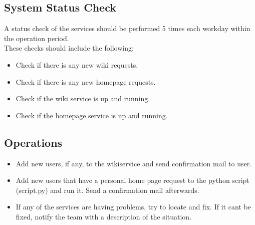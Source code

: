 \subsection{System Status Check}
A status check of the services should be performed 5 times each workday within the operation period.\\
These checks should include the following:
\begin{itemize}
\item Check if there is any new wiki requests.
\item Check if there is any new homepage requests.
\item Check if the wiki service is up and running.
\item Check if the homepage service is up and running.
\end{itemize}
\subsection{Operations}
\begin{itemize}
\item Add new users, if any, to the wikiservice and send confirmation mail to user.
\item Add new users that have a personal home page request to the python script (script.py) and run it. Send a confirmation mail afterwards.
\item If any of the services are having problems, try to locate and fix. If it cant be fixed, notify the team with a description of the situation.
\end{itemize}
